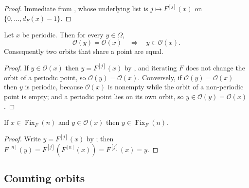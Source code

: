 \begin{proof}
  \leanok
  Immediate from , whose underlying list is
  $j\mapsto F^{[j]}(x)$ on $\{0,\dots,d_F(x)-1\}$.
\end{proof}

\begin{lemma}
  \label{lemma:weil-frobenius-orbits-equal-or-disjoint}
  \leanok

  Let $x$ be periodic.  Then for every $y\in\Omega$,
  \[
    \mathcal O(y)=\mathcal O(x)
    \quad\Longleftrightarrow\quad
    y\in\mathcal O(x).
  \]
  Consequently two orbits that share a point are equal.
\end{lemma}

\begin{proof}
  \leanok
  If $y\in\mathcal O(x)$ then $y=F^{[j]}(x)$ by
  , and iterating $F$ does not change
  the orbit of a periodic point, so $\mathcal O(y)=\mathcal O(x)$.
  Conversely, if $\mathcal O(y)=\mathcal O(x)$ then $y$ is periodic, because
  $\mathcal O(x)$ is nonempty while the orbit of a non-periodic point is
  empty; and a periodic point lies on its own orbit, so
  $y\in\mathcal O(y)=\mathcal O(x)$.
\end{proof}

\begin{lemma}
  \label{lemma:weil-frobenius-orbit-period-invariant}
  \leanok

  If $x\in\operatorname{Fix}_F(n)$ and $y\in\mathcal O(x)$ then
  $y\in\operatorname{Fix}_F(n)$.
\end{lemma}

\begin{proof}
  \leanok
  Write $y=F^{[j]}(x)$ by ; then
  $F^{[n]}(y)=F^{[j]}(F^{[n]}(x))=F^{[j]}(x)=y$.
\end{proof}

\subsection{Counting orbits}

